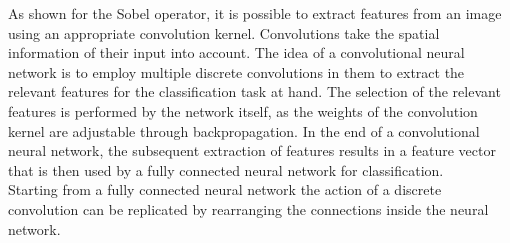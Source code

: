 As shown for the Sobel operator, it is possible to extract features from an image using an appropriate convolution kernel. Convolutions take the spatial information of their input into account. The idea of a convolutional neural network is to employ multiple discrete convolutions in them to extract the relevant features for the classification task at hand. The selection of the relevant features is performed by the network itself, as the weights of the convolution kernel are adjustable through backpropagation. In the end of a convolutional neural network, the subsequent extraction of features results in a feature vector that is then used by a fully connected neural network for classification.\\

Starting from a fully connected neural network the action of a discrete convolution can be replicated by rearranging the connections inside the neural network. \\ %



